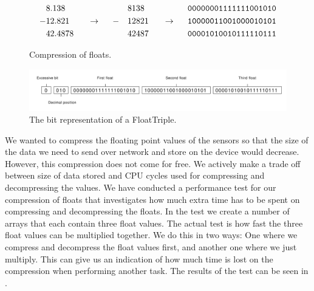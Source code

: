 \begin{figure}[!htbp]
    \begin{alignat*}{6}
       &8.138   &&                   &&   && 8138  &&                   && \text{\texttt{00000001111111001010}} \\
      -&12.821  && ~~ \rightarrow ~~ && - && 12821 && ~~ \rightarrow ~~ && \text{\texttt{10000011001000010101}} \\
       &42.4878 &&                   &&   && 42487 &&                   && \text{\texttt{00001010010111110111}} 
    \end{alignat*}
    \caption{Compression of floats.}
    \label{fig:float_triple_convert}
\end{figure}

\begin{figure}[!htbp]
    \centering
    \includegraphics[width=\textwidth]{graphic/gathering_sensor_data/float_triple_bit.pdf}
    \caption{The bit representation of a FloatTriple.}
    \label{fig:float_triple_bit}
\end{figure}
We wanted to compress the floating point values of the sensors so that the size of the data we need to send over network and store on the device would decrease. However, this compression does not come for free. We actively make a trade off between size of data stored and CPU cycles used for compressing and decompressing the values. We have conducted a performance test for our compression of floats that investigates how much extra time has to be spent on compressing and decompressing the floats. In the test we create a number of arrays that each contain three float values. The actual test is how fast the three float values can be multiplied together. We do this in two ways: One where we compress and decompress the float values first, and another one where we just multiply. This can give us an indication of how much time is lost on the compression when performing another task. The results of the test can be seen in .


